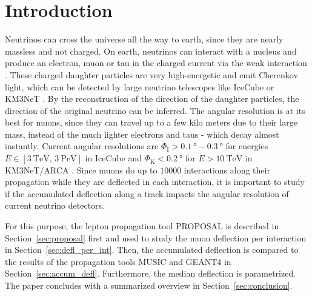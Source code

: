 \section{Introduction}\label{sec:introduction}
Neutrinos can cross the universe all the way to earth, since they are 
nearly massless and not charged. On earth, neutrinos can interact 
with a nucleus and produce an electron, muon or tau in the charged current 
via the weak interaction \cite{pdg}. These charged daughter particles are very 
high-energetic and emit Cherenkov light, which can be detected 
by large neutrino telescopes like IceCube \cite{IceCube_Instrumentation} or 
KM3NeT \cite{KM3NeT_Design}. 
By the reconstruction of the direction of the daughter particles, the direction 
of the original neutrino can be inferred. The angular resolution is at its 
best for muons, since they can travel up to a few kilo meters due to their 
large mass, instead of the much lighter electrons and taus - which decay almost 
instantly. Current angular resolutions are 
$\Phi_{\text{I}} > \SI{0.1}{\degree} - \SI{0.3}{\degree}$ for energies 
$E \in [\SI{3}{\tera\electronvolt},\,\SI{3}{\peta\electronvolt}]$ in IceCube 
\cite{IceCube_Resolution2021} 
and 
$\Phi_{\text{K}} < \SI{0.2}{\degree}$ for $E > \SI{10}{\tera\electronvolt}$ in 
KM3NeT/ARCA \cite{KM3NeT_Resolution2021}.
Since muons do up to $\num{10000}$ interactions along their propagation while they 
are deflected in each interaction, it is important to study if the accumulated 
deflection along a track impacts the angular resolution of current 
neutrino detectors. 

For this purpose, the lepton propagation 
tool PROPOSAL \cite{koehne2013proposal, dunsch_2018_proposal_improvements} is described in Section~\ref{sec:proposal} first and used to study the muon deflection per interaction in 
Section~\ref{sec:defl_per_int}. Then, the
accumulated deflection is compared to the results of the propagation tools MUSIC and GEANT4 in Section~\ref{sec:accum_defl}. Furthermore, the median deflection is parametrized. The 
paper concludes with a summarized overview in Section~\ref{sec:conclusion}.



